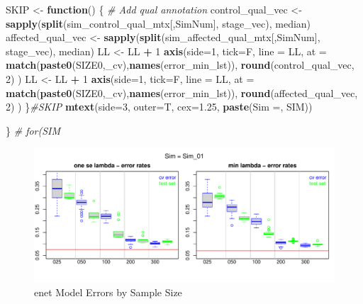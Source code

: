 \documentclass[
]{book}
\newenvironment{Shaded}{\begin{snugshade}}{\end{snugshade}}
\newcommand{\CommentTok}[1]{\textcolor[rgb]{0.56,0.35,0.01}{\textit{#1}}}
\newcommand{\ControlFlowTok}[1]{\textcolor[rgb]{0.13,0.29,0.53}{\textbf{#1}}}
\newcommand{\DataTypeTok}[1]{\textcolor[rgb]{0.13,0.29,0.53}{#1}}
\newcommand{\DecValTok}[1]{\textcolor[rgb]{0.00,0.00,0.81}{#1}}
\newcommand{\FloatTok}[1]{\textcolor[rgb]{0.00,0.00,0.81}{#1}}
\newcommand{\KeywordTok}[1]{\textcolor[rgb]{0.13,0.29,0.53}{\textbf{#1}}}
\newcommand{\NormalTok}[1]{#1}
\newcommand{\OperatorTok}[1]{\textcolor[rgb]{0.81,0.36,0.00}{\textbf{#1}}}
\newcommand{\StringTok}[1]{\textcolor[rgb]{0.31,0.60,0.02}{#1}}
\begin{document}
\begin{Shaded}
\begin{Highlighting}[]
\NormalTok{SKIP  <{-}}\StringTok{ }\ControlFlowTok{function}\NormalTok{() \{}
\CommentTok{\# Add qual annotation}
\NormalTok{control\_qual\_vec <{-}}\StringTok{ }\KeywordTok{sapply}\NormalTok{(}\KeywordTok{split}\NormalTok{(sim\_control\_qual\_mtx[,SimNum], stage\_vec), median)}
\NormalTok{affected\_qual\_vec <{-}}\StringTok{ }\KeywordTok{sapply}\NormalTok{(}\KeywordTok{split}\NormalTok{(sim\_affected\_qual\_mtx[,SimNum], stage\_vec), median)}
\NormalTok{LL <{-}}\StringTok{ }\NormalTok{LL }\OperatorTok{+}\StringTok{ }\DecValTok{1}
\KeywordTok{axis}\NormalTok{(}\DataTypeTok{side=}\DecValTok{1}\NormalTok{, }\DataTypeTok{tick=}\NormalTok{F, }\DataTypeTok{line =}\NormalTok{ LL,}
  \DataTypeTok{at =} \KeywordTok{match}\NormalTok{(}\KeywordTok{paste0}\NormalTok{(SIZE0,}\StringTok{\textquotesingle{}\_cv\textquotesingle{}}\NormalTok{),}\KeywordTok{names}\NormalTok{(error\_min\_lst)),}
  \KeywordTok{round}\NormalTok{(control\_qual\_vec, }\DecValTok{2}\NormalTok{)}
\NormalTok{ )}
\NormalTok{LL <{-}}\StringTok{ }\NormalTok{LL }\OperatorTok{+}\StringTok{ }\DecValTok{1}
\KeywordTok{axis}\NormalTok{(}\DataTypeTok{side=}\DecValTok{1}\NormalTok{, }\DataTypeTok{tick=}\NormalTok{F, }\DataTypeTok{line =}\NormalTok{ LL,}
  \DataTypeTok{at =} \KeywordTok{match}\NormalTok{(}\KeywordTok{paste0}\NormalTok{(SIZE0,}\StringTok{\textquotesingle{}\_cv\textquotesingle{}}\NormalTok{),}\KeywordTok{names}\NormalTok{(error\_min\_lst)),}
  \KeywordTok{round}\NormalTok{(affected\_qual\_vec, }\DecValTok{2}\NormalTok{)}
\NormalTok{ )}
\NormalTok{\}}\CommentTok{\#SKIP}
\KeywordTok{mtext}\NormalTok{(}\DataTypeTok{side=}\DecValTok{3}\NormalTok{, }\DataTypeTok{outer=}\NormalTok{T, }\DataTypeTok{cex=}\FloatTok{1.25}\NormalTok{, }\KeywordTok{paste}\NormalTok{(}\StringTok{\textquotesingle{}Sim =\textquotesingle{}}\NormalTok{,  SIM))}

\NormalTok{\} }\CommentTok{\# for(SIM}
\end{Highlighting}
\end{Shaded}

\begin{figure}
\centering
\includegraphics{Static/figures/enet-simRes-errors-bySim-1.pdf}
\caption{\label{fig:enet-simRes-errors-bySim}enet Model Errors by Sample Size}
\end{figure}
\end{document}
